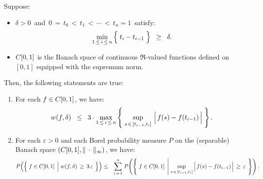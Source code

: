 \begin{proposition}
\mbox{}\vskip 0.2cm
\noindent
Suppose:
\begin{itemize}
\item	$\delta > 0$\, and \,$0 \,=\, t_{0} \,<\, t_{1} \,<\, \cdots \,<\, t_{n} = 1$\, satisfy:
		\begin{equation*}
		\min_{1\,\leq\,i\,\leq\,n}\left\{\;\overset{{\color{white}.}}{t}_{i} - t_{i-1}\;\right\}
		\;\; \geq \;\; \delta.
		\end{equation*}
\item	$C[0,1]$ is the Banach space of continuous $\Re$-valued functions defined on $[0,1]$
		equipped with the supremum norm.
\end{itemize}
Then, the following statements are true:
\begin{enumerate}
\item	For each $f \in C[0,1]$, we have:
		\begin{equation*}
		w(f,\delta) \;\; \leq \;\; 3 \cdot
			\max_{1\,\leq\,i\,\leq\,n}\left\{\;
				\sup_{s\,\in\,[t_{i-1},t_{i}]}\,\left\vert\,\overset{{\color{white}.}}{f}(s) - f(t_{i-1})\,\right\vert
			\;\right\}.
		\end{equation*}
\item	For each $\varepsilon > 0$ and each Borel probability measure $P$ on
		the (separable) Banach space $\left(C[0,1],\Vert\,\cdot\,\Vert_{\infty}\right)$,
		we have:
		\begin{eqnarray*}
		P\!\left(\left\{\;f\in\Czo\;\left\vert\;\overset{{\color{white}1}}{w}(f,\delta)\,\geq\,3\,\varepsilon\right.\;\right\}\right)
		&\leq& \overset{n}{\underset{i\,=\,1}{\sum}}\;
			P\!\left(\left\{\; f\in\Czo \;\left\vert\;
				\underset{s\,\in\,[t_{i-1},t_{i}]}{\sup}
				\left\vert\,f(s) \overset{{\color{white}.}}{-} f(t_{i-1})\,\right\vert\,\geq\,\varepsilon
				\right.\;\right\}\right).
		\end{eqnarray*}
\end{enumerate}
\end{proposition}
\proof
